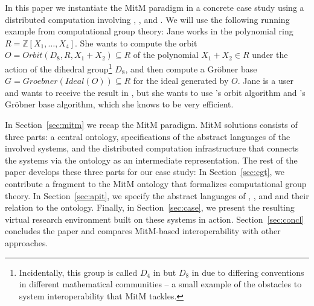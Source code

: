 In this paper we instantiate the MitM paradigm in a concrete case study using a distributed computation involving \GAP, \Sage, and \Singular.
We will use the following running example from computational group theory: Jane works in the polynomial ring $R=\mathbb{Z}[X_1,\ldots,X_4]$.
She wants to compute the orbit $O=Orbit(D_8,R,X_1+X_2)\subseteq R$ of the polynomial $X_1+X_2\in R$ under the action of the dihedral group\footnote{Incidentally, this group is called $D_4$ in \Sage but $D_8$ in \GAP due to differing conventions in different mathematical communities -- a small example of the obstacles to system interoperability that MitM tackles.} $D_8$, and then compute a Gr\"obner base $G=Groebner(Ideal(O))\subseteq R$ for the ideal generated by $O$.
Jane is a \Sage user and wants to receive the result in \Sage, but she wants to use \GAP's orbit algorithm and \Singular's Gr\"obner base algorithm, which she knows to be very efficient.

In Section~\ref{sec:mitm} we recap the MitM paradigm.
MitM solutions consists of three parts: a central ontology, specifications of the abstract languages of the involved systems, and the distributed computation infrastructure that connects the systems via the ontology as an intermediate representation.
The rest of the paper develops these three parts for our case study:
In Section~\ref{sec:cgt}, we contribute a fragment to the MitM ontology that formalizes computational group theory.
In Section~\ref{sec:apit}, we specify the abstract languages of \GAP, \Sage, and \Singular and their relation to the ontology.
Finally, in Section~\ref{sec:case}, we present the resulting virtual research environment built on these systems in action.
Section~\ref{sec:concl} concludes the paper and compares MitM-based interoperability with other approaches.


